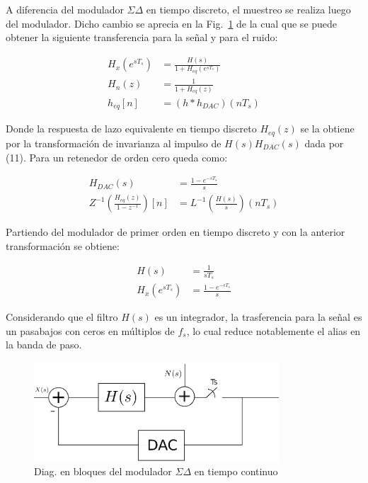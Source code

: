 \documentclass[a4paper,conference]{IEEEtran}
\begin{document}
A diferencia del modulador $\Sigma\Delta$ en tiempo discreto, el muestreo se realiza luego del modulador. Dicho cambio se aprecia en la Fig.~\ref{fig:SDTC} de la cual que se puede obtener la siguiente transferencia para la señal y para el ruido:


\begin{align}
H_x(e^{sT_s}) &= \frac{H(s)}{1+H_{eq}(e^{sT_s})} \\
H_n(z) &= \frac{1}{1+H_{eq}(z)} \\
h_{eq}[n] &= (h\ast h_{DAC})(nT_s)
\end{align}

Donde la respuesta de lazo equivalente en tiempo discreto $H_{eq}(z)$ se la obtiene por la transformaci\'on de invarianza al impulso\cite{DSP:Pro-Man} de $H(s)H_{DAC}(s)$ dada por (11). Para un retenedor de orden cero queda como:

\begin{align}
 H_{DAC}(s)&=\frac{1-e^{-sT_s}}{s}\\
 Z^{-1}(\frac{H_{eq}(z)}{1-z^{-1}})[n]&=L^{-1}(\frac{H(s)}{s})(nT_s)
\end{align}

Partiendo del modulador de primer orden en tiempo discreto y con la anterior transformaci\'on se obtiene:

\begin{align}
 H(s)&=\frac{1}{sT_s}\\
 H_x(e^{sT_s})&= \frac{1-e^{-sT_s}}{s}
\end{align}

Considerando que el filtro $H(s)$ es un integrador, la trasferencia para la se\~nal es un pasabajos con ceros en múltiplos de $f_s$, lo cual reduce notablemente el alias en la banda de paso.

\begin{figure}[!t]
\centering
\includegraphics[width=3.6in]{Sigma-Delta_Tiempo_Continuo}
\caption{Diag. en bloques del modulador $\Sigma\Delta$ en tiempo continuo}
\label{fig:SDTC}
\end{figure}
\end{document}
